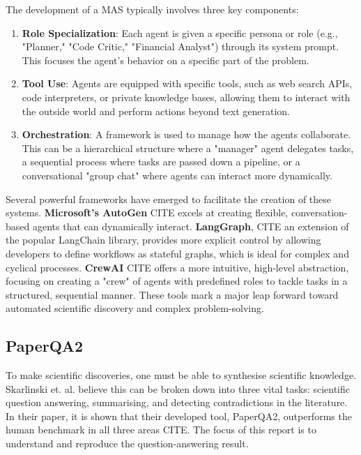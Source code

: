 The development of a MAS typically involves three key components:
\begin{enumerate}
    \item \textbf{Role Specialization}: Each agent is given a specific persona or role (e.g., "Planner," "Code Critic," "Financial Analyst") through its system prompt. This focuses the agent's behavior on a specific part of the problem.
    \item \textbf{Tool Use}: Agents are equipped with specific tools, such as web search APIs, code interpreters, or private knowledge bases, allowing them to interact with the outside world and perform actions beyond text generation.
    \item \textbf{Orchestration}: A framework is used to manage how the agents collaborate. This can be a hierarchical structure where a "manager" agent delegates tasks, a sequential process where tasks are passed down a pipeline, or a conversational "group chat" where agents can interact more dynamically.
\end{enumerate}

Several powerful frameworks have emerged to facilitate the creation of these systems. \textbf{Microsoft's AutoGen} CITE excels at creating flexible, conversation-based agents that can dynamically interact. \textbf{LangGraph}, CITE an extension of the popular LangChain library, provides more explicit control by allowing developers to define workflows as stateful graphs, which is ideal for complex and cyclical processes. \textbf{CrewAI} CITE offers a more intuitive, high-level abstraction, focusing on creating a "crew" of agents with predefined roles to tackle tasks in a structured, sequential manner. These tools mark a major leap forward toward automated scientific discovery and complex problem-solving. \\

\subsection{PaperQA2}
To make scientific discoveries, one must be able to synthesise scientific knowledge.
Skarlinski et. al. believe this can be broken down into three vital tasks: scientific question answering, summarising, and detecting contradictions in the literature.
In their paper, it is shown that their developed tool, PaperQA2, outperforms the human benchmark in all three areas CITE. 
The focus of this report is to understand and reproduce the question-answering result. \\


